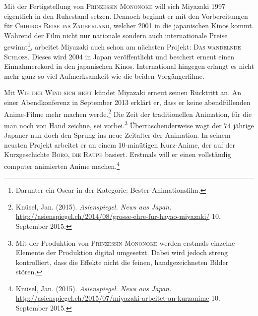 Mit der Fertigstellung von \textsc{Prinzessin Mononoke} will sich Miyazaki 1997 eigentlich in den Ruhestand setzen. Dennoch beginnt er mit den Vorberei\-tungen für \textsc{Chihiros Reise ins Zauberland}, welcher 2001 in die japanischen Kinos kommt. Während der Film nicht nur nationale sondern auch internationale Preise gewinnt\footnote{Darunter ein Oscar in der Kategorie: Bester Animationsfilm.}, arbeitet Miyazaki auch schon am nächsten Projekt: \textsc{Das wandelnde Schloss}. Dieses wird 2004 in Japan veröffentlicht und beschert erneut einen Einnahmerekord in den japanischen Kinos. International hingegen erlangt es nicht mehr ganz so viel Aufmerksamkeit wie die beiden Vorgängerfilme. 

Mit \textsc{Wie der Wind sich hebt} kündet Miyazaki erneut seinen Rücktritt an. An einer Abendkonferenz in September 2013 erklärt er, dass er keine abend\-füllenden Anime-Filme mehr machen werde.\footnote{Knüsel, Jan. (2015). \emph{Asienspiegel. News aus Japan.}\\ \url{http://asienspiegel.ch/2014/08/grosse-ehre-fur-hayao-miyazaki/} 10. September 2015.} Die Zeit der traditionellen Animation, für die man noch von Hand zeichne, sei vorbei.\footnote{Mit der Produktion von \textsc{Prinzessin Mononoke} werden erstmals einzelne Elemente der Produktion digital umgesetzt. Dabei wird jedoch streng kontrolliert, dass die Effekte nicht die feinen, handgezeichneten Bilder stören.} Überraschenderweise wagt der 74 jährige Japaner nun doch den Sprung ins neue Zeitalter der Animation. In seinem neusten Projekt arbeitet er an einem 10-minütigen Kurz-Anime, der auf der Kurzgeschichte \textsc{Boro, die Raupe} basiert. Erstmals will er einen vollständig computer animierten Anime machen.\footnote{Knüsel, Jan. (2015). \emph{Asienspiegel. News aus Japan.}\\ \url{http://asienspiegel.ch/2015/07/miyazaki-arbeitet-an-kurzanime} 10. September 2015.}